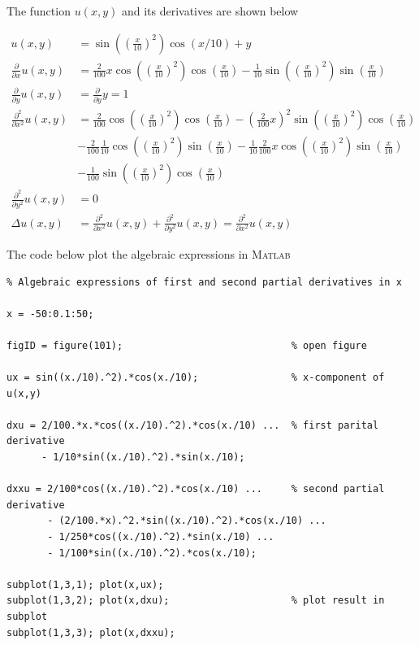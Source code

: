 \documentclass[paper=a4, fontsize=12pt]{article} %
\begin{document}
The function $u(x,y)$ and its derivatives are shown below

\begin{align*}
u(x,y) &= \sin\left(\left(\frac{x}{10}\right) ^2\right ) \cos(x/10)+y \\
\frac{\partial}{\partial x} u(x,y) &= \frac{2}{100}x\cos\left(\left(\frac{x}{10}\right) ^2\right )\cos\left(\frac{x}{10}\right )- \frac{1}{10}\sin\left(\left(\frac{x}{10}\right) ^2\right )\sin\left (\frac{x}{10}\right )\\
\frac{\partial}{\partial y} u(x,y) &= \frac{\partial}{\partial y}y = 1   \\
\frac{\partial^2}{\partial x^2} u(x,y) &= \frac{2}{100}\cos\left(\left(\frac{x}{10}\right) ^2\right )\cos\left(\frac{x}{10}\right ) - \left ( \frac{2}{100}x\right )^2 \sin \left(\left(\frac{x}{10}\right) ^2\right )\cos\left(\frac{x}{10}\right ) \\
 &- \frac{2}{100}\frac{1}{10}\cos\left(\left(\frac{x}{10}\right) ^2\right )\sin\left(\frac{x}{10}\right ) - \frac{1}{10}\frac{2}{100}x \cos\left(\left(\frac{x}{10}\right) ^2\right )\sin\left (\frac{x}{10}\right )\\
 & - \frac{1}{100}\sin\left(\left(\frac{x}{10}\right) ^2\right )\cos\left (\frac{x}{10}\right )\\
\frac{\partial^2}{\partial y^2} u(x,y) &= 0 \\
\Delta u(x,y) &= \frac{\partial^2}{\partial x^2} u(x,y) + \frac{\partial^2}{\partial y^2} u(x,y) =  \frac{\partial^2}{\partial x^2} u(x,y)
\end{align*}


The code below plot the algebraic expressions in \textsc{Matlab}

\begin{lstlisting}
% Algebraic expressions of first and second partial derivatives in x

x = -50:0.1:50;

figID = figure(101);                             % open figure

ux = sin((x./10).^2).*cos(x./10);                % x-component of u(x,y)

dxu = 2/100.*x.*cos((x./10).^2).*cos(x./10) ...  % first parital derivative
      - 1/10*sin((x./10).^2).*sin(x./10);

dxxu = 2/100*cos((x./10).^2).*cos(x./10) ...     % second partial derivative
       - (2/100.*x).^2.*sin((x./10).^2).*cos(x./10) ...
       - 1/250*cos((x./10).^2).*sin(x./10) ...
       - 1/100*sin((x./10).^2).*cos(x./10);
       
subplot(1,3,1); plot(x,ux);
subplot(1,3,2); plot(x,dxu);                     % plot result in subplot
subplot(1,3,3); plot(x,dxxu);

\end{lstlisting}
\end{document}
